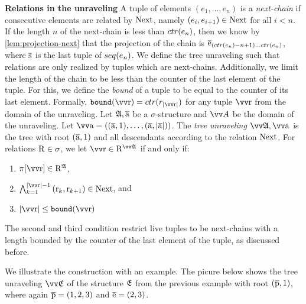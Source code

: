 \noindent
\textbf{Relations in the unraveling}
A tuple of elements $(e_{1}, \ldots, e_{n})$ is a \emph{next-chain} if consecutive elements are related by $\mathrm{Next}$, namely $(e_{i}, e_{i+1}) \in \mathrm{Next}$ for all $i < n$.
If the length $n$ of the next-chain is less than $\ctr{e_{n}}$, then we know by \cref{lem:projection-next} that the projection of the chain is $\elemtuplee_{(\ctr{e_{n}}-n+1)\ldots{}\ctr{e_{n}}}$, where $\overline{\mathrm{s}}$ is the last tuple of $\seq{e_{n}}$.
We define the tree unraveling such that relations are only realized by tuples which are next-chains.
Additionally, we limit the length of the chain to be less than the counter of the last element of the tuple.
For this, we define the \emph{bound} of a tuple to be equal to the counter of its last element.
Formally, $\mathtt{bound}(\elemtuptupler) = \ctr{r_{|\elemtuptupler|}}$ for any tuple $\elemtuptupler$ from the domain of the unraveling.
Let ${\mathfrak{A}}, \overline{\mathrm{a}}$ be a $\sigma$-structure and $\unraveldom{A}$ be the domain of the unraveling.
Let $\elemtuptuplea = ((\elemtuplea, 1), \ldots, (\elemtuplea, |\elemtuplea|))$.
The \emph{tree unraveling} $\unravel{A}, \elemtuptuplea$ is the tree with root $(\overline{\mathrm{a}}, 1)$ and all descendants according to the relation $\mathrm{Next}$.
For relations $\mathrm{R} \in \sigma$, we let $\elemtuptupler \in \relR^{\unravel{A}}$ if and only if:\begin{enumerate}
  \item $\pi[\elemtuptupler] \in \relR^{\str{A}}$,
  \item $\bigwedge_{k=1}^{|\elemtuptupler|-1}{(\elemr_{k},\elemr_{k+1}) \in \relNext}$, and
  \item $|\elemtuptupler| \le \mathtt{bound}(\elemtuptupler)$
\end{enumerate}
The second and third condition restrict live tuples to be next-chains with a length bounded by the counter of the last element of the tuple, as discussed before.

We illustrate the construction with an example.
The picure below shows the tree unraveling $\unravel{E}$ of the structure ${\mathfrak{E}}$ from the previous example with root $(\overline{\mathrm{p}}, 1)$, where again $\overline{\mathrm{p}} = (1,2,3)$ and $\overline{\mathrm{e}} = (2,3)$.
\begin{figure}[H]
  \centering
  
\end{figure}

